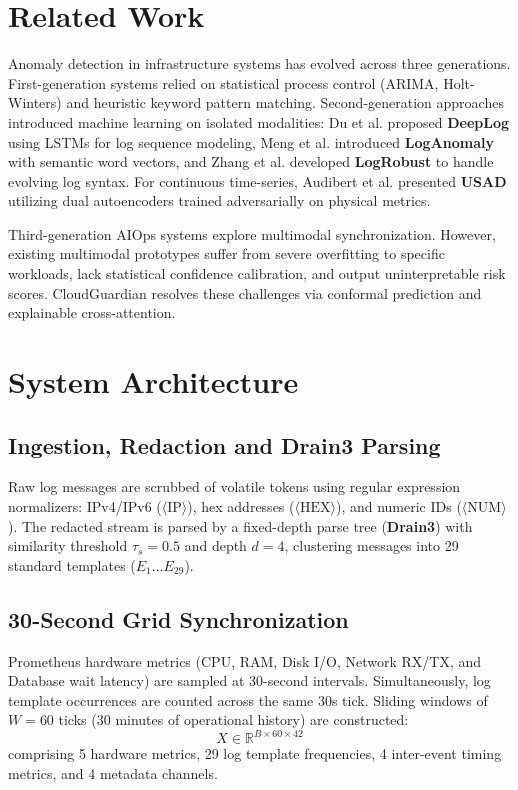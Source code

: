 \documentclass[conference]{IEEEtran}
\begin{document}
\section{Related Work}
Anomaly detection in infrastructure systems has evolved across three generations. First-generation systems relied on statistical process control (ARIMA, Holt-Winters) and heuristic keyword pattern matching. Second-generation approaches introduced machine learning on isolated modalities: Du et al. proposed \textbf{DeepLog} using LSTMs for log sequence modeling, Meng et al. introduced \textbf{LogAnomaly} with semantic word vectors, and Zhang et al. developed \textbf{LogRobust} to handle evolving log syntax. For continuous time-series, Audibert et al. presented \textbf{USAD} utilizing dual autoencoders trained adversarially on physical metrics. 

Third-generation AIOps systems explore multimodal synchronization. However, existing multimodal prototypes suffer from severe overfitting to specific workloads, lack statistical confidence calibration, and output uninterpretable risk scores. CloudGuardian resolves these challenges via conformal prediction and explainable cross-attention.

\section{System Architecture}

\subsection{Ingestion, Redaction and Drain3 Parsing}
Raw log messages are scrubbed of volatile tokens using regular expression normalizers: IPv4/IPv6 ($\langle\text{IP}\rangle$), hex addresses ($\langle\text{HEX}\rangle$), and numeric IDs ($\langle\text{NUM}\rangle$). The redacted stream is parsed by a fixed-depth parse tree (\textbf{Drain3}) with similarity threshold $\tau_s = 0.5$ and depth $d = 4$, clustering messages into 29 standard templates ($E_1 \dots E_{29}$).

\subsection{30-Second Grid Synchronization}
Prometheus hardware metrics (CPU, RAM, Disk I/O, Network RX/TX, and Database wait latency) are sampled at 30-second intervals. Simultaneously, log template occurrences are counted across the same 30s tick. Sliding windows of $W=60$ ticks (30 minutes of operational history) are constructed:
\begin{equation}
X \in \mathbb{R}^{B \times 60 \times 42}
\end{equation}
comprising 5 hardware metrics, 29 log template frequencies, 4 inter-event timing metrics, and 4 metadata channels.
\end{document}
